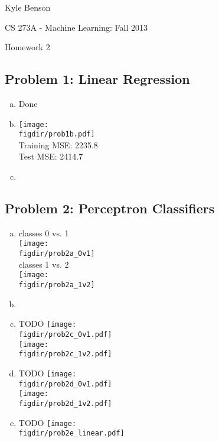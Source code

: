 \documentclass[twoside,11pt]{article}
\newcommand{\figdir}{figs}
\theoremstyle{definition}
\begin{document}
\centerline{\Large Kyle Benson}
\centerline{CS 273A - Machine Learning: Fall 2013}
\centerline{Homework 2}

\subsection*{Problem 1: Linear Regression}

\begin{enumerate}[(a)]
\item Done
\item \vspace{-1in}
\texttt{[image: \\figdir/prob1b.pdf]} \\
Training MSE: 2235.8 \\
Test MSE: 2414.7

\item 

\end{enumerate}


\subsection*{Problem 2: Perceptron Classifiers}

\begin{enumerate}[(a)]
\item classes 0 vs. 1 \\
\texttt{[image: \\figdir/prob2a\_0v1]} \\
classes 1 vs. 2 \\
\texttt{[image: \\figdir/prob2a\_1v2]} \\

\item 

\item TODO
\texttt{[image: \\figdir/prob2c\_0v1.pdf]} \\
\texttt{[image: \\figdir/prob2c\_1v2.pdf]}

\item TODO
\texttt{[image: \\figdir/prob2d\_0v1.pdf]} \\
\texttt{[image: \\figdir/prob2d\_1v2.pdf]}

\item TODO
\texttt{[image: \\figdir/prob2e\_linear.pdf]} \\

\end{enumerate}
\end{document}
